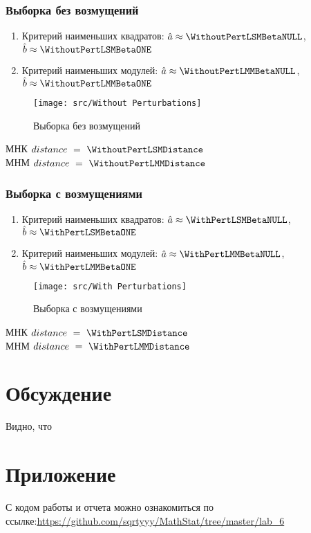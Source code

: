\documentclass[a4paper]{article}
\begin{document}
            \subsubsection{Выборка без возмущений}
                \begin{enumerate}
                    \item{Критерий наименьших квадратов:}
                    $\hat{a}\approx \WithoutPertLSMBetaNULL$, $\hat{b}\approx \WithoutPertLSMBetaONE$
                    \item{Критерий наименьших модулей:}
                    $\hat{a}\approx \WithoutPertLMMBetaNULL$, $\hat{b}\approx \WithoutPertLMMBetaONE$
                \end{enumerate}
                \begin{figure}[H]
                    \centering
                    \texttt{[image: src/Without Perturbations]}
                    \caption{Выборка без возмущений}
                    \label{without_pert}
                \end{figure}
                МНК$~distance~=~\WithoutPertLSMDistance$ \\
		        МНМ$~distance~=~\WithoutPertLMMDistance$

            \subsubsection{Выборка с возмущениями}
                \begin{enumerate}
                    \item{Критерий наименьших квадратов:}
                    $\hat{a}\approx \WithPertLSMBetaNULL$, $\hat{b}\approx \WithPertLSMBetaONE$
                    \item{Критерий наименьших модулей:}
                    $\hat{a}\approx \WithPertLMMBetaNULL$, $\hat{b}\approx \WithPertLMMBetaONE$
                \end{enumerate}
                \begin{figure}[H]
                    \centering
                    \texttt{[image: src/With Perturbations]}
                    \caption{Выборка с возмущениями}
                    \label{with_pert}
                \end{figure}
                МНК$~distance~=~\WithPertLSMDistance$ \\
		        МНМ$~distance~=~\WithPertLMMDistance$

	\section{Обсуждение}
        Видно, что
    \section{Приложение}
        С кодом работы и отчета можно ознакомиться по ссылке:\;\url{https://github.com/sqrtyyy/MathStat/tree/master/lab_6}
\end{document}
